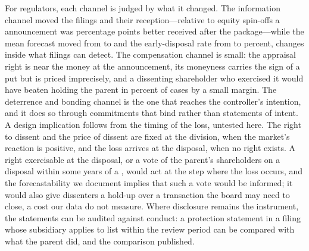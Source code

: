 For regulators, each channel is judged by what it changed. The information channel moved the filings and their reception---relative to equity spin-offs a \captive{} announcement was \DiDCxP{} percentage points better received after the package---while the mean forecast moved from \ScorePre{} to \ScorePost{} and the early-disposal rate from \EarlyPre{} to \EarlyPost{} percent, changes inside what \ProtPostN{} filings can detect. The compensation channel is small: the appraisal right is near the money at the announcement, its moneyness carries the sign of a put but is priced imprecisely, and a dissenting shareholder who exercised it would have beaten holding the parent in \ExerciseBeats{} percent of cases by a small margin. The deterrence and bonding channel is the one that reaches the controller's intention, and it does so through commitments that bind rather than statements of intent. A design implication follows from the timing of the loss, untested here. The right to dissent and the price of dissent are fixed at the division, when the market's reaction is positive, and the loss arrives at the disposal, when no right exists. A right exercisable at the disposal, or a vote of the parent's shareholders on a disposal within some years of a \captive{}, would act at the step where the loss occurs, and the forecastability we document implies that such a vote would be informed; it would also give dissenters a hold-up over a transaction the board may need to close, a cost our data do not measure. Where disclosure remains the instrument, the statements can be audited against conduct: a protection statement in a filing whose subsidiary applies to list within the review period can be compared with what the parent did, and the comparison published.
